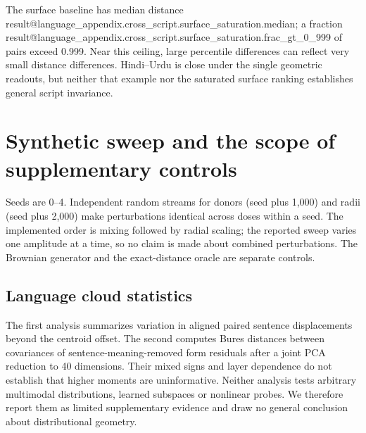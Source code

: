 \documentclass[mlmain]{jmlr}
\makeatletter
\newcommand{\Result}[1]{\csname result@#1\endcsname}
\makeatother
\begin{document}
The surface baseline has median distance
\Result{language_appendix.cross_script.surface_saturation.median}; a fraction
\Result{language_appendix.cross_script.surface_saturation.frac_gt_0_999} of pairs exceed 0.999.
Near this ceiling, large percentile differences can reflect very small distance differences.
Hindi--Urdu is close under the single geometric readouts, but neither that example nor the
saturated surface ranking establishes general script invariance.

\section{Synthetic sweep and the scope of supplementary controls}
\label{app:synthetic}

\begin{table}[h]
\centering\small
\caption{Five-seed means for every declared perturbation setting. $S$ scores all 253 unique
internal splits; ``Deep'' scores the five unique splits from the first two levels. E: Euclidean;
C: cosine. Individual seed scores, full-tree exactness and normalized RF distances are saved in
the result record. Seed variability appears in Figure~\ref{fig:synthetic}, not as an uncertainty estimate
for the empirical populations.}
\end{table}

Seeds are 0--4. Independent random streams for donors (seed plus 1,000) and radii (seed plus 2,000)
make perturbations identical across doses within a seed. The implemented order is mixing followed
by radial scaling; the reported sweep varies one amplitude at a time, so no claim is made about
combined perturbations. The Brownian generator and the exact-distance oracle are separate controls.

\subsection{Language cloud statistics}
\label{app:clouds}

\begin{table}[h]
\centering\small
\caption{Language cloud statistics, residualized on centroid distance. Displacement-magnitude
values are available only to three decimals; covariance values are recomputed from pair-level
distances. These are association tests on 94 within-family pairs, not additional
tree-reconstruction methods.}
\end{table}

The first analysis summarizes variation in aligned paired sentence displacements beyond the
centroid offset. The second computes Bures distances between covariances of sentence-meaning-removed
form residuals after a joint PCA reduction to 40 dimensions. Their mixed signs and layer dependence do not establish that higher moments are
uninformative. Neither analysis tests arbitrary multimodal distributions, learned subspaces or
nonlinear probes. We therefore report them as limited supplementary evidence and draw no general
conclusion about distributional geometry.
\end{document}
